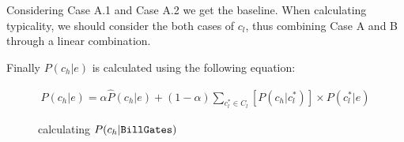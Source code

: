 %

Considering Case A.1 and Case A.2 we get the baseline. When calculating typicality, we should consider the both cases of $c_l$, thus combining Case A and B through a linear combination.

Finally  $P({c_h}|e)$ is calculated using the following equation:

\begin{equation}
\begin{split}
P({c_h}|e) = \alpha \hat{P}({c_h}|e)+ (1-\alpha) \sum_{ c_{l}^*\in C_{l} } [P({c_h}|c_{l}^*) ] \times  P(c_{l}^*|e)
\end{split}
\label{eq:pgge}\end{equation}







\begin{figure*}[!hptb]
\label{fig:pgge}
\centering
{}
\caption{calculating $P({c_h}|{\tt Bill Gates})$ }
\end{figure*}


